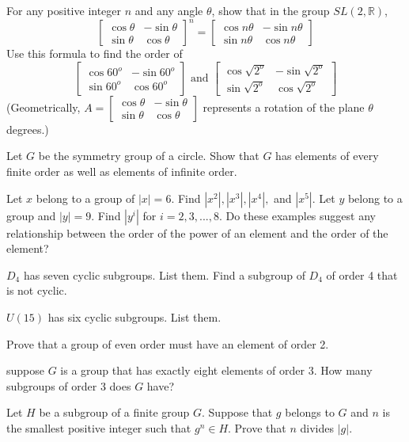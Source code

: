 \documentclass[11pt,largemargins]{homework}
\begin{document}
\question
For any positive integer $n$ and any angle $\theta$, show that in the group $SL(2,\mathbb{R})$,
\[
\begin{bmatrix}
    \cos\theta & -\sin\theta \\
    \sin\theta & \cos\theta 
\end{bmatrix}^n
=
\begin{bmatrix}
    \cos n\theta & -\sin n\theta \\
    \sin n\theta & \cos n\theta 
\end{bmatrix}
\]
Use this formula to find the order of 
\[
\begin{bmatrix}
    \cos 60^o & -\sin 60^o \\
    \sin 60^o & \cos 60^o 
\end{bmatrix}
\text{ and }
\begin{bmatrix}
    \cos\sqrt{2^o} & -\sin\sqrt{2^o} \\
    \sin\sqrt{2^o} & \cos\sqrt{2^o} 
\end{bmatrix}
\]
(Geometrically, $A = \begin{bmatrix} \cos\theta & -\sin\theta \\ \sin\theta & \cos\theta \end{bmatrix}$ represents a rotation
of the plane $\theta$ degrees.)

\question
Let $G$ be the symmetry group of a circle. Show that $G$ has elements of every finite order as well as 
elements of infinite order.

\question
Let $x$ belong to a group of $|x|=6$. Find $|x^2|,|x^3|,|x^4|,$ and $|x^5|$. Let $y$ belong to a group 
and $|y|=9$. Find $|y^i|$ for $i=2,3,...,8$. Do these examples suggest any relationship between the order of the power 
of an element and the order of the element?

\question
$D_4$ has seven cyclic subgroups. List them. Find a subgroup of $D_4$ of order 4 that is not cyclic.

\question
$U(15)$ has six cyclic subgroups. List them.

\question
Prove that a group of even order must have an element of order 2.

\question
suppose $G$ is a group that has exactly eight elements of order 3. How many subgroups of order 3 does $G$ have?

\question
Let $H$ be a subgroup of a finite group $G$. Suppose that $g$ belongs to $G$ and $n$ is the smallest positive integer 
such that $g^n\in H$. Prove that $n$ divides $|g|$.
\end{document}
